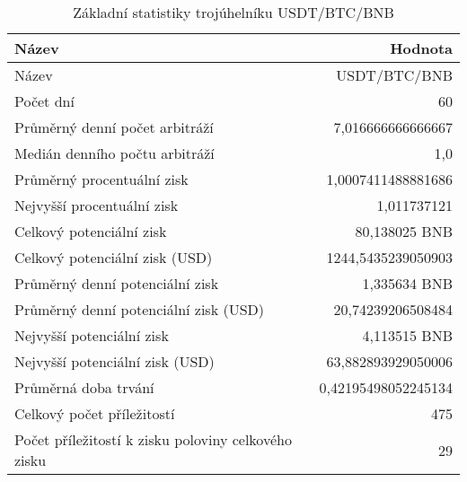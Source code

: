 \begin{table}\centering
\caption{Základní statistiky trojúhelníku USDT/BTC/BNB}
\label{USDTBTCBNB_stats}
\begin{tabular}{|| l | r ||}
\hline Název & Hodnota \\ 
\hline\hline Název & USDT/BTC/BNB \\ 
\hline Počet dní & 60 \\ 
\hline Průměrný denní počet arbitráží & 7,016666666666667 \\ 
\hline Medián denního počtu arbitráží & 1,0 \\ 
\hline Průměrný procentuální zisk & 1,0007411488881686 \\ 
\hline Nejvyšší procentuální zisk & 1,011737121 \\ 
\hline Celkový potenciální zisk & 80,138025 BNB \\ 
\hline Celkový potenciální zisk (USD) & 1244,5435239050903 \\ 
\hline Průměrný denní potenciální zisk & 1,335634 BNB \\ 
\hline Průměrný denní potenciální zisk (USD) & 20,74239206508484 \\ 
\hline Nejvyšší potenciální zisk & 4,113515 BNB \\ 
\hline Nejvyšší potenciální zisk (USD) & 63,882893929050006 \\ 
\hline Průměrná doba trvání & 0,42195498052245134 \\ 
\hline Celkový počet příležitostí & 475 \\ 
\hline Počet příležitostí k zisku poloviny celkového zisku & 29 \\ 
\hline
\end{tabular}
\end{table}